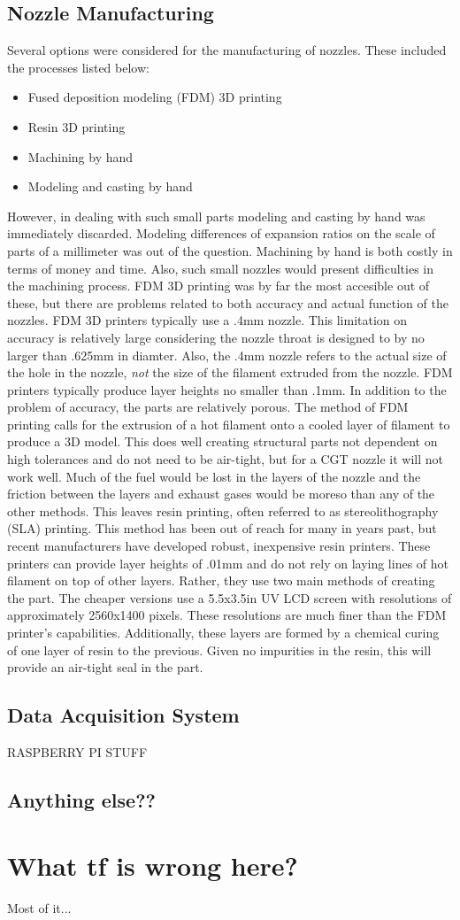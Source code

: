 \subsection{Nozzle Manufacturing}
Several options were considered for the manufacturing of nozzles. These included the processes listed below:
\begin{itemize}
\item Fused deposition modeling (FDM) 3D printing
\item Resin 3D printing
\item Machining by hand
\item Modeling and casting by hand
\end{itemize}
However, in dealing with such small parts modeling and casting by hand was immediately discarded. Modeling differences of expansion ratios on the scale of parts of a millimeter was out of the question. Machining by hand is both costly in terms of money and time. Also, such small nozzles would present difficulties in the machining process. FDM 3D printing was by far the most accesible out of these, but there are problems related to both accuracy and actual function of the nozzles. FDM 3D printers typically use a .4mm nozzle. This limitation on accuracy is relatively large considering the nozzle throat is designed to by no larger than .625mm in diamter. Also, the .4mm nozzle refers to the actual size of the hole in the nozzle, \textit{not} the size of the filament extruded from the nozzle. FDM printers typically produce layer heights no smaller than .1mm. In addition to the problem of accuracy, the parts are relatively porous. The method of FDM printing calls for the extrusion of a hot filament onto a cooled layer of filament to produce a 3D model. This does well creating structural parts not dependent on high tolerances and do not need to be air-tight, but for a CGT nozzle it will not work well. Much of the fuel would be lost in the layers of the nozzle and the friction between the layers and exhaust gases would be moreso than any of the other methods. This leaves resin printing, often referred to as stereolithography (SLA) printing. This method has been out of reach for many in years past, but recent manufacturers have developed robust, inexpensive resin printers. These printers can provide layer heights of .01mm and do not rely on laying lines of hot filament on top of other layers. Rather, they use two main methods of creating the part. The cheaper versions use a 5.5x3.5in UV LCD screen with resolutions of approximately 2560x1400 pixels. These resolutions are much finer than the FDM printer's capabilities. Additionally, these layers are formed by a chemical curing of one layer of resin to the previous. Given no impurities in the resin, this will provide an air-tight seal in the part.
\subsection{Data Acquisition System}
RASPBERRY PI STUFF
\subsection{Anything else??}

\section{What tf is wrong here?}
Most of it...